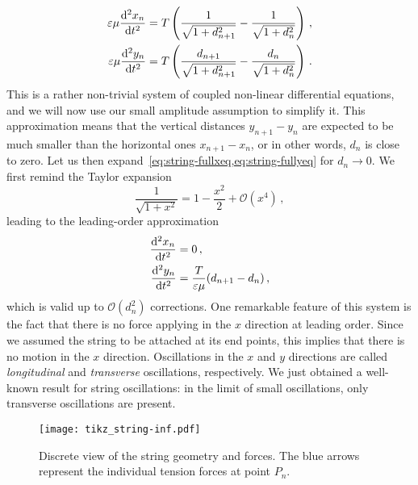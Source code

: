 \begin{align}
  \varepsilon\mu \frac{\mathrm{d}^2 x_n}{\mathrm{d} t^2}&=
  T\left(\frac{1}{\sqrt{1+d_{\smash{n+1}}^2}}-\frac{1}{\sqrt{1+d_{n}^2}}\right)\,,
  \label{eq:string-fullxeq}\\
  \varepsilon\mu \frac{\mathrm{d}^2 y_n}{\mathrm{d} t^2}&=
  T\left(\frac{d_{n+1}}{\sqrt{1+d_{\smash{n+1}}^2}}-\frac{d_n}{\sqrt{1+d_{n}^2}}\right)\,.
  \label{eq:string-fullyeq}
\end{align}
This is a rather non-trivial system of coupled non-linear differential equations, and we
will now use our small amplitude assumption to simplify it. This approximation means that
the vertical distances $y_{n+1}-y_n$ are expected to be much smaller than the horizontal
ones $x_{n+1}-x_n$, or in other words, $d_n$ is close to zero. Let us then
expand~\cref{eq:string-fullxeq,eq:string-fullyeq} for $d_n\to 0$. We first remind the
Taylor expansion
\begin{equation}
  \frac{1}{\sqrt{1+x^2}}=1-\frac{x^2}{2}+\mathcal{O}(x^4)\,,
\end{equation}
leading to the leading-order approximation
\begin{align}
  \frac{\mathrm{d}^2 x_n}{\mathrm{d} t^2}&=0\,,\label{eq:string-loxeq}\\
  \frac{\mathrm{d}^2 y_n}{\mathrm{d} t^2}&=\frac{T}{\varepsilon\mu}(d_{n+1}-d_n)\,,\label{eq:string-loyeq}
\end{align}
which is valid up to $\mathcal{O}(d_n^2)$ corrections. One remarkable feature of this
system is the fact that there is no force applying in the $x$ direction at leading order.
Since we assumed the string to be attached at its end points, this implies that there is
no motion in the $x$ direction. Oscillations in the $x$ and $y$ directions are called
\emph{longitudinal} and \emph{transverse} oscillations, respectively. We just obtained a
well-known result for string oscillations: in the limit of small oscillations, only
transverse oscillations are present.
\begin{figure}[t]
  \centering
  \texttt{[image: tikz\_string-inf.pdf]}
  \caption{Discrete view of the string geometry and forces. The blue arrows represent the
  individual tension forces at point $P_n$.}
  \label{fig:string-inf}
\end{figure}

